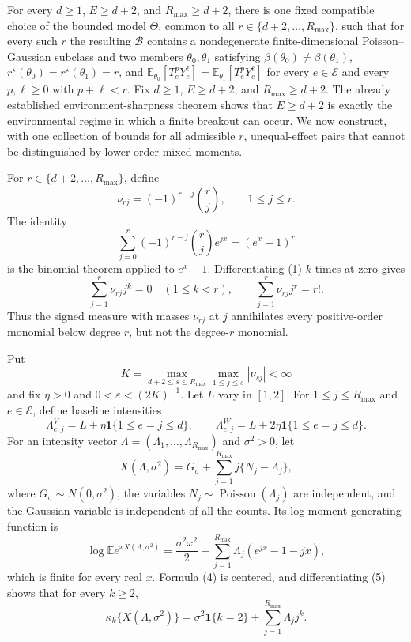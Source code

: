 For every \(d\geq1\), \(E\geq d+2\), and \(R_{\max}\geq d+2\), there is one fixed compatible choice of the bounded model \(\Theta\), common to all \(r\in\{d+2,\ldots,R_{\max}\}\), such that for every such \(r\) the resulting \(\mathcal B\) contains a nondegenerate finite-dimensional Poisson--Gaussian subclass and two members \(\theta_0,\theta_1\) satisfying \(\beta(\theta_0)\neq\beta(\theta_1)\), \(r^\star(\theta_0)=r^\star(\theta_1)=r\), and \(\mathbb E_{\theta_0}[T_e^pY_e^{\ell}]=\mathbb E_{\theta_1}[T_e^pY_e^{\ell}]\) for every \(e\in\mathcal E\) and every \(p,\ell\geq0\) with \(p+\ell<r\).
Fix \(d\geq1\), \(E\geq d+2\), and \(R_{\max}\geq d+2\).  The already established environment-sharpness theorem shows that \(E\geq d+2\) is exactly the environmental regime in which a finite breakout can occur.  We now construct, with one collection of bounds for all admissible \(r\), unequal-effect pairs that cannot be distinguished by lower-order mixed moments.

For \(r\in\{d+2,\ldots,R_{\max}\}\), define
\[
 \nu_{rj}=(-1)^{r-j}{r\choose j},\qquad 1\leq j\leq r.
\]
The identity
\[
 \sum_{j=0}^{r}(-1)^{r-j}{r\choose j}e^{jx}=(e^x-1)^r
 \tag{1}
\]
is the binomial theorem applied to \(e^x-1\).  Differentiating (1) \(k\) times at zero gives
\[
 \sum_{j=1}^{r}\nu_{rj}j^k=0\quad(1\leq k<r),
 \qquad
 \sum_{j=1}^{r}\nu_{rj}j^r=r!.
 \tag{2}
\]
Thus the signed measure with masses \(\nu_{rj}\) at \(j\) annihilates every positive-order monomial below degree \(r\), but not the degree-\(r\) monomial.

Put
\[
 K=\max_{d+2\leq s\leq R_{\max}}\max_{1\leq j\leq s}|\nu_{sj}|<\infty
\]
and fix \(\eta>0\) and \(0<\varepsilon<(2K)^{-1}\).  Let \(L\) vary in \([1,2]\).  For \(1\leq j\leq R_{\max}\) and \(e\in\mathcal E\), define baseline intensities
\[
 \Lambda^{V}_{e,j}=L+\eta\mathbf 1\{1\leq e=j\leq d\},
 \qquad
 \Lambda^{W}_{e,j}=L+2\eta\mathbf 1\{1\leq e=j\leq d\}.
 \tag{3}
\]
For an intensity vector \(\Lambda=(\Lambda_1,\ldots,\Lambda_{R_{\max}})\) and \(\sigma^2>0\), let
\[
 X(\Lambda,\sigma^2)
 =G_{\sigma}+
   \sum_{j=1}^{R_{\max}}j\{N_j-\Lambda_j\},
 \tag{4}
\]
where \(G_{\sigma}\sim N(0,\sigma^2)\), the variables \(N_j\sim\operatorname{Poisson}(\Lambda_j)\) are independent, and the Gaussian variable is independent of all the counts.  Its log moment generating function is
\[
 \log\mathbb E e^{xX(\Lambda,\sigma^2)}
 =\frac{\sigma^2x^2}{2}
  +\sum_{j=1}^{R_{\max}}\Lambda_j(e^{jx}-1-jx),
 \tag{5}
\]
which is finite for every real \(x\).  Formula (4) is centered, and differentiating (5) shows that for every \(k\geq2\),
\[
 \kappa_k\{X(\Lambda,\sigma^2)\}
 =\sigma^2\mathbf 1\{k=2\}+
   \sum_{j=1}^{R_{\max}}\Lambda_jj^k.
 \tag{6}
\]


